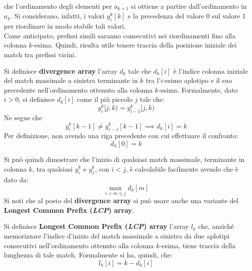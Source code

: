 che l'ordinamento degli elementi per $a_{k+1}$ si ottiene a partire
dall'ordinamento in $a_k$. Si considerano, infatti, i valori $y_i^k[k]$ e la
precedenza del valore 0 sul valore 1 per riordinare in modo stabile tali
valori.\\ 
Come anticipato, prefissi simili saranno consecutivi nei riordinamenti fino alla
colonna $k$-esima. Quindi, risulta utile tenere traccia della posizione iniziale
dei match tra prefissi vicini. 
\begin{definizione}
  Si definisce \textbf{divergence array} l'array $d_k$ tale che $d_k[i]$ è
  l'indice colonna iniziale del match massimale a sinistra terminante in $k$ tra
  l'$i$-esimo aplotipo e il suo precedente nell'ordinamento ottenuto alla
  colonna $k$-esima. Formalmente, dato $i>0$, si definisce 
  $d_k[i]$ come il più piccolo $j$ tale che:
  \begin{equation}
    \label{eq:pbwtdiv}
    y_i^k[j,k)=y_{i-1}^k[j,k)
  \end{equation}
  Ne segue che
  \begin{equation}
    \label{eq:pbwtdiv2}
    y_i^k[k-1]\neq y_{i-1}^k[k-1] \implies d_k[i]=k
  \end{equation}
  Per definizione, non avendo una riga precedente con cui effettuare il
  confronto: 
  \begin{equation}
    \label{eq:pbwtdiv3}
   d_k[0]=k
  \end{equation}
\end{definizione}
Si può quindi dimostrare che l'inizio di qualsiasi match massimale, terminante in
colonna $k$, tra qualsiasi $y_i^k$ e $y_j^k$, con $i<j$, è calcolabile facilmente
avendo che è dato da:
\begin{equation}
  \label{eq:pbwtint}
  \max_{i<m\leq j}d_k[m]
\end{equation}
Si noti che al posto del \textbf{divergence array} si può usare anche una
variante del \textbf{Longest Common Prefix (\textit{LCP}) array}.
\begin{definizione}
  Si definisce \textbf{Longest Common Prefix (\textit{LCP}) array} l'array $l_k$
  che, anziché 
  memorizzare l'indice d'inizio del match massimale a sinistra da due aplotipi
  consecutivi nell'ordinamento ottenuto alla colonna $k$-esima, tiene traccia
  della lunghezza di tale match. Formalmente si ha, quindi, che:
  \begin{equation}
    \label{eq:pbwtlcp}
    l_k[i]=k-d_k[i]
  \end{equation}
\end{definizione}
